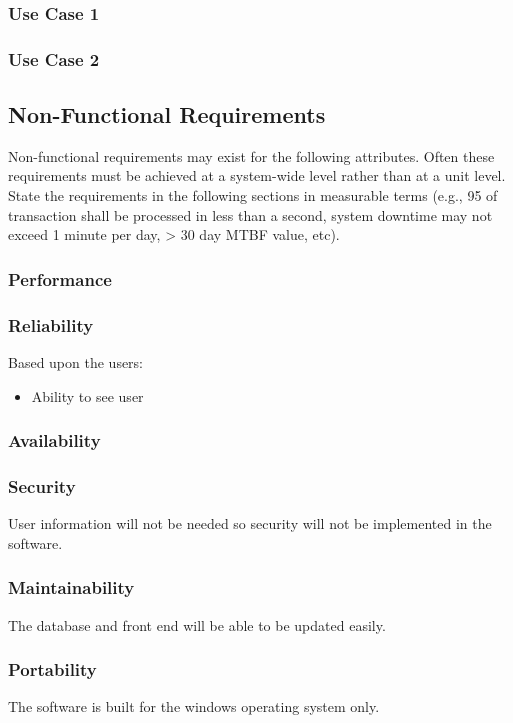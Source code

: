 \documentclass[titlepage]{article}
\begin{document}
\subsubsection{Use Case 1}

\subsubsection{Use Case 2}

\subsection{Non-Functional Requirements}
Non-functional requirements may exist for the following attributes.  Often these requirements must be achieved at a system-wide level rather than at a unit level.  State the requirements in the following sections in measurable terms (e.g., 95 of transaction shall be processed in less than a second, system downtime may not exceed 1 minute per day, > 30 day MTBF value, etc). 

\subsubsection{Performance}

\subsubsection{Reliability}
Based upon the users:
\begin{itemize}
	\item Ability to see user 
\end{itemize}

\subsubsection{Availability}


\subsubsection{Security}
User information will not be needed so security will not be implemented in the software. 

\subsubsection{Maintainability}
The database and front end will be able to be updated easily. 

\subsubsection{Portability}
The software is built for the windows operating system only. 
\end{document}
